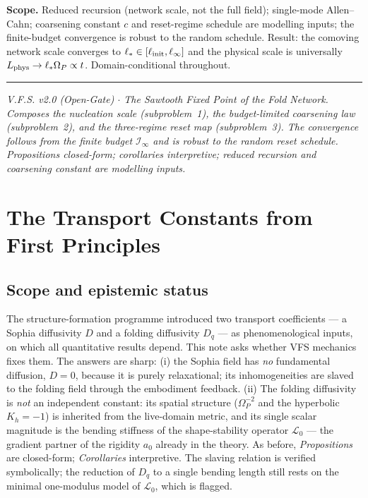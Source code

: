 \documentclass[11pt,a4paper,oneside]{book}
\newcommand{\Op}{\Omega_P}
\newcommand{\Dq}{D_q}
\newcommand{\Lp}{L_{\rm phys}}
\newcommand{\Ib}{\mathcal I}
\newcommand{\linit}{\ell_{\rm init}}
\newcommand{\Lop}{\mathcal{L}_0}
\theoremstyle{plain}
\theoremstyle{definition}
\theoremstyle{remark}
\begin{document}
\textbf{Scope.} Reduced recursion (network scale, not the full field); single-mode Allen--Cahn; coarsening
constant $c$ and reset-regime schedule are modelling inputs; the finite-budget convergence is robust to
the random schedule. Result: the comoving network scale converges to $\ell_\ast\in[\linit,\ell_\infty]$
and the physical scale is universally $\Lp\to\ell_\ast\Op\propto t$. Domain-conditional throughout.

\vspace{0.5em}
\hrule
\smallskip
\noindent\footnotesize\emph{V.F.S. v2.0 (Open-Gate) $\cdot$ The Sawtooth Fixed Point of the Fold Network.
Composes the nucleation scale (subproblem~1), the budget-limited coarsening law (subproblem~2), and the
three-regime reset map (subproblem~3). The convergence follows from the finite budget $\Ib_\infty$ and is
robust to the random reset schedule. Propositions closed-form; corollaries interpretive; reduced recursion
and coarsening constant are modelling inputs.}

\chapter{The Transport Constants from First Principles}

\section*{Scope and epistemic status}
The structure-formation programme introduced two transport coefficients --- a Sophia diffusivity $D$ and a
folding diffusivity $\Dq$ --- as phenomenological inputs, on which all quantitative results depend. This
note asks whether VFS mechanics fixes them. The answers are sharp: (i) the Sophia field has \emph{no}
fundamental diffusion, $D=0$, because it is purely relaxational; its inhomogeneities are slaved to the
folding field through the embodiment feedback. (ii) The folding diffusivity is \emph{not} an independent
constant: its spatial structure ($\Op^{-2}$ and the hyperbolic $K_h=-1$) is inherited from the
live-domain metric, and its single scalar magnitude is the bending stiffness of the shape-stability
operator $\Lop$ --- the gradient partner of the rigidity $a_0$ already in the theory. As before,
\emph{Propositions} are closed-form; \emph{Corollaries} interpretive. The slaving relation is verified
symbolically; the reduction of $\Dq$ to a single bending length still rests on the minimal one-modulus
model of $\Lop$, which is flagged.

\end{document}
